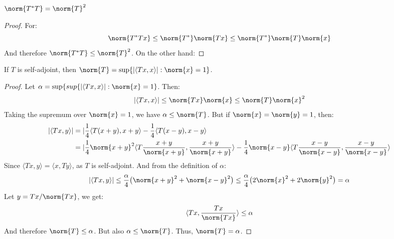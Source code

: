 \documentclass[crop=false,class=book,oneside]{standalone}
\begin{document}
            \begin{theorem}
                $\norm{T^{*}T}=\norm{T}^{2}$
            \end{theorem}
            \begin{proof}
                For:
                \begin{equation*}
                    \norm{T^{*}Tx}\leq\norm{T^{*}}\norm{Tx}\leq
                    \norm{T^{*}}\norm{T}\norm{x}
                \end{equation*}
                And therefore $\norm{T^{*}T}\leq\norm{T}^{2}$.
                On the other hand:
            \end{proof}
            \begin{theorem}
                If $T$ is self-adjoint, then
                $\norm{T}=\sup\{|\langle{Tx,x}\rangle|:\norm{x}=1\}$.
            \end{theorem}
            \begin{proof}
                \label{thm:Funct:Norm_of_Self_Adjoint_Operator}
                Let
                $\alpha=\sup\{sup\{|\langle{Tx,x}\rangle|:\norm{x}=1\}$.
                Then:
                \begin{equation*}
                    |\langle{Tx,x}\rangle|
                    \leq\norm{Tx}\norm{x}\leq\norm{T}\norm{x}^{2}
                \end{equation*}
                Taking the supremum over $\norm{x}=1$, we have
                $\alpha\leq\norm{T}$. But if $\norm{x}=\norm{y}=1$,
                then:
                \begin{align*}
                    |\langle{Tx,y}\rangle|
                    &=|\frac{1}{4}\langle{T(x+y),x+y}\rangle
                    -\frac{1}{4}\langle{T(x-y),x-y}\rangle\\
                    &=|\frac{1}{4}\norm{x+y}^{2}\langle
                    T\frac{x+y}{\norm{x+y}},\frac{x+y}{\norm{x+y}}\rangle
                    -\frac{1}{4}\norm{x-y}\langle
                    T\frac{x-y}{\norm{x-y}},\frac{x-y}{\norm{x-y}}\rangle
                \end{align*}
                Since $\langle{Tx,y}\rangle=\langle{x,Ty}\rangle$,
                as $T$ is self-adjoint. And from the definition of
                $\alpha$:
                \begin{equation*}
                    |\langle{Tx,y}\rangle|
                    \leq\frac{\alpha}{4}
                    \big(\norm{x+y}^{2}+\norm{x-y}^{2}\big)
                    \leq\frac{\alpha}{4}
                    \big(2\norm{x}^{2}+2\norm{y}^{2}\big)
                    =\alpha
                \end{equation*}
                Let $y=Tx/\norm{Tx}$, we get:
                \begin{equation*}
                    \langle{Tx,\frac{Tx}{\norm{Tx}}}\rangle\leq\alpha
                \end{equation*}
                And therefore $\norm{T}\leq\alpha$. But also
                $\alpha\leq\norm{T}$. Thus, $\norm{T}=\alpha$.
            \end{proof}
\end{document}
